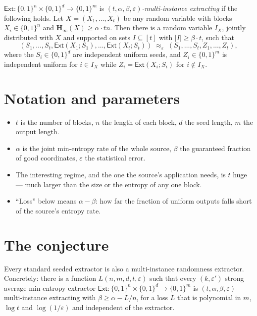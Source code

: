 \documentclass{aicr-conjecture}
\newcommand{\bits}{\{0,1\}}
\newcommand{\Ext}{\mathsf{Ext}}
\newcommand{\Hmin}{\mathbf{H}_{\infty}}
\newcommand{\eps}{\varepsilon}
\begin{document}
\begin{definition}\label{def:mie}
$\Ext : \bits^{n} \times \bits^{d} \to \bits^{m}$ is
\emph{$(t,\alpha,\beta,\eps)$-multi-instance extracting} if the following
holds. Let $X = (X_1, \dots, X_t)$ be any random variable with blocks
$X_i \in \bits^{n}$ and $\Hmin(X) \ge \alpha \cdot t n$. Then there is a
random variable $I_X$, jointly distributed with $X$ and supported on sets
$I \subseteq [t]$ with $|I| \ge \beta \cdot t$, such that
\[
  (S_1, \dots, S_t, \Ext(X_1; S_1), \dots, \Ext(X_t; S_t))
  \;\approx_{\eps}\;
  (S_1, \dots, S_t, Z_1, \dots, Z_t),
\]
where the $S_i \in \bits^{d}$ are independent uniform seeds, and
$Z_i \in \bits^{m}$ is independent uniform for $i \in I_X$ while
$Z_i = \Ext(X_i; S_i)$ for $i \notin I_X$.
\end{definition}

\section{Notation and parameters}\label{sec:notation}

\begin{itemize}[nosep]
  \item $t$ is the number of blocks, $n$ the length of each block, $d$
    the seed length, $m$ the output length.
  \item $\alpha$ is the joint min-entropy rate of the whole source,
    $\beta$ the guaranteed fraction of good coordinates, $\eps$ the
    statistical error.
  \item The interesting regime, and the one the source's application
    needs, is $t$ huge --- much larger than the size or the entropy of any
    one block.
  \item ``Loss'' below means $\alpha - \beta$: how far the fraction of
    uniform outputs falls short of the source's entropy rate.
\end{itemize}

\section{The conjecture}\label{sec:conjectures}

\begin{conjecture}\label{conj:main}
Every standard seeded extractor is also a multi-instance randomness
extractor. Concretely: there is a function $L(n,m,d,t,\eps)$ such that
every $(k, \eps')$ strong average min-entropy extractor
$\Ext : \bits^{n} \times \bits^{d} \to \bits^{m}$ is
$(t, \alpha, \beta, \eps)$-multi-instance extracting with
$\beta \ge \alpha - L/n$, for a loss $L$ that is polynomial in $m$,
$\log t$ and $\log(1/\eps)$ and independent of the extractor.
\end{conjecture}
\end{document}
